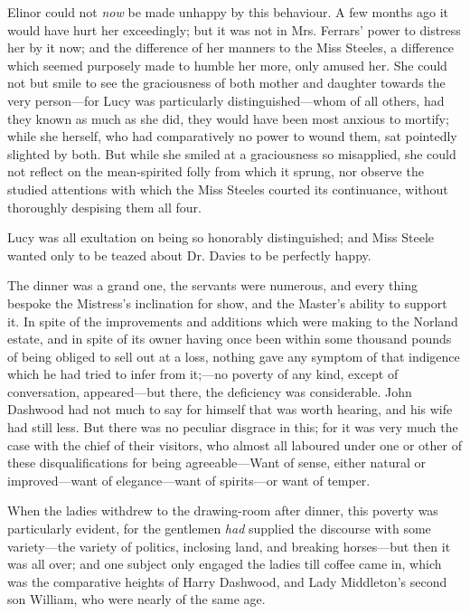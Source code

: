 Elinor could not {\em now} be made unhappy by this behaviour. A few months ago it would have hurt her exceedingly; but it was not in Mrs. Ferrars' power to distress her by it now; and the difference of her manners to the Miss Steeles, a difference which seemed purposely made to humble her more, only amused her. She could not but smile to see the graciousness of both mother and daughter towards the very person---for Lucy was particularly distinguished---whom of all others, had they known as much as she did, they would have been most anxious to mortify; while she herself, who had comparatively no power to wound them, sat pointedly slighted by both. But while she smiled at a graciousness so misapplied, she could not reflect on the mean-spirited folly from which it sprung, nor observe the studied attentions with which the Miss Steeles courted its continuance, without thoroughly despising them all four.

Lucy was all exultation on being so honorably distinguished; and Miss Steele wanted only to be teazed about Dr. Davies to be perfectly happy.

The dinner was a grand one, the servants were numerous, and every thing bespoke the Mistress's inclination for show, and the Master's ability to support it. In spite of the improvements and additions which were making to the Norland estate, and in spite of its owner having once been within some thousand pounds of being obliged to sell out at a loss, nothing gave any symptom of that indigence which he had tried to infer from it;---no poverty of any kind, except of conversation, appeared---but there, the deficiency was considerable. John Dashwood had not much to say for himself that was worth hearing, and his wife had still less. But there was no peculiar disgrace in this; for it was very much the case with the chief of their visitors, who almost all laboured under one or other of these disqualifications for being agreeable---Want of sense, either natural or improved---want of elegance---want of spirits---or want of temper.

When the ladies withdrew to the drawing-room after dinner, this poverty was particularly evident, for the gentlemen {\em had} supplied the discourse with some variety---the variety of politics, inclosing land, and breaking horses---but then it was all over; and one subject only engaged the ladies till coffee came in, which was the comparative heights of Harry Dashwood, and Lady Middleton's second son William, who were nearly of the same age.

